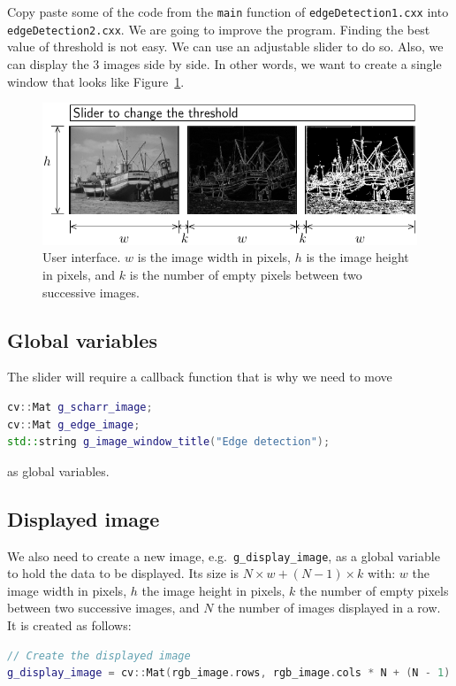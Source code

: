 \documentclass[english,a4paper,12pt,oneside]{article}
\begin{document}
Copy paste some of the code from the \verb+main+ function of \verb+edgeDetection1.cxx+ into \verb+edgeDetection2.cxx+. 
We are going to improve the program. 
Finding the best value of threshold is not easy. 
We can use an adjustable slider to do so. 
Also, we can display the 3 images side by side. 
In other words, we want to create a single window that looks like Figure~\ref{fig:window}. 
\begin{figure}[htbp]
 \centering
 \includegraphics{display}
 \caption{\label{fig:window}User interface. $w$ is the image width in pixels, $h$ is the image height in pixels, and $k$ is the number of empty pixels between two successive images.}
\end{figure}

\subsection{Global variables}
The slider will require a callback function that is why we need to move 
 \begin{lstlisting}[language=c++]
cv::Mat g_scharr_image;
cv::Mat g_edge_image;
std::string g_image_window_title("Edge detection");
\end{lstlisting}
as global variables. 


\subsection{Displayed image}

We also need to create a new image, e.g.~\verb+g_display_image+, as a global variable to hold the data to be displayed. 
Its size is $N \times w + (N - 1) \times k$ with:
 $w$ the image width in pixels, $h$ the image height in pixels, $k$ the number of empty pixels between two successive images, and
 $N$ the number of images displayed in a row.
It is created as follows:
 \begin{lstlisting}[language=c++]
// Create the displayed image
g_display_image = cv::Mat(rgb_image.rows, rgb_image.cols * N + (N - 1) * k, CV_32FC1, cv::Scalar(0.5, 0.5, 0.5));
\end{lstlisting}
\end{document}
